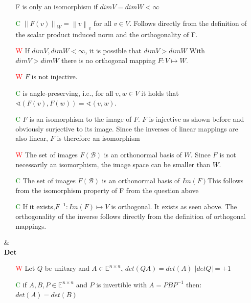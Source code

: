 \documentclass[7pt,landscape, margin = 0.1mm]{article}
\begin{document}
\begin{multicols}{4}
\begin{flushleft}
\begin{itemize}
\textcolor{Emerald}{F is only an isomorphism if $dim V = dimW < \infty$}
\item[\textcolor{green}{C}] $\left\| F(v) \right\|_W = \left\|v \right\|_v$ for all $v \in V$.
\textcolor{Emerald}{Follows directly from the definition of the scalar product induced norm and the orthogonality
of F.}
\item[\textcolor{red}{W}] If $dimV, dimW < \infty $, it is possible that $dimV > dimW$
\textcolor{Emerald}{With $dimV > dimW$ there is no orthogonal mapping $F : V \mapsto W$}.
\item[\textcolor{red}{W}] $F$ is not injective.
\item[\textcolor{green}{C}] is angle-preserving, i.e., for all $v,w \in V$ it holds that $\sphericalangle (F(v), F(w)) = \sphericalangle (v,w)$.
\item[\textcolor{green}{C}] $F$ is an isomorphism to the image of $F$.
\textcolor{Emerald}{$F$ is injective as shown before and obviously surjective to its image. Since the inverses
of linear mappings are also linear, $F$ is therefore an isomorphism}
\item[\textcolor{red}{W}] The set of images $F(\mathcal{B})$ is an orthonormal basis of $W$.
\textcolor{Emerald}{Since $F$ is not necessarily an isomorphism, the image space can be smaller than $W$.}
\item[\textcolor{green}{C}] The set of images $F(\mathcal{B})$ is an orthonormal basis of $Im(F)$\textcolor{Emerald}{This follows from the isomorphism property of F from the question above}
\item[\textcolor{green}{C}]If it exists,$ F^{-1} : Im(F) \mapsto V$ is orthogonal.
 \textcolor{Emerald}{It exists as seen above. The orthogonality of the inverse follows directly from the definition
of orthogonal mappings.}
\end{itemize}
\hspace{3mm}
\hline & \\[3mm]
\scriptsize
\textbf{Det}
\tiny \\
\begin{itemize}
\item[\textcolor{red}{W}] Let $Q $ be unitary and  $A \in \mathbb{E}^{n \times n} $, $det(QA) = det(A) $ \textcolor{Emerald}{$|det Q| =\pm 1 $}
\item[\textcolor{green}{C}] if $A,B,P \in \mathbb{E}^{n \times n} $ and $P$ is invertible with $A=PBP^{-1}$ then: $det(A)=det(B)$
\end{itemize}
\hspace{3mm}


\end{flushleft}
\end{multicols}
\end{document}
